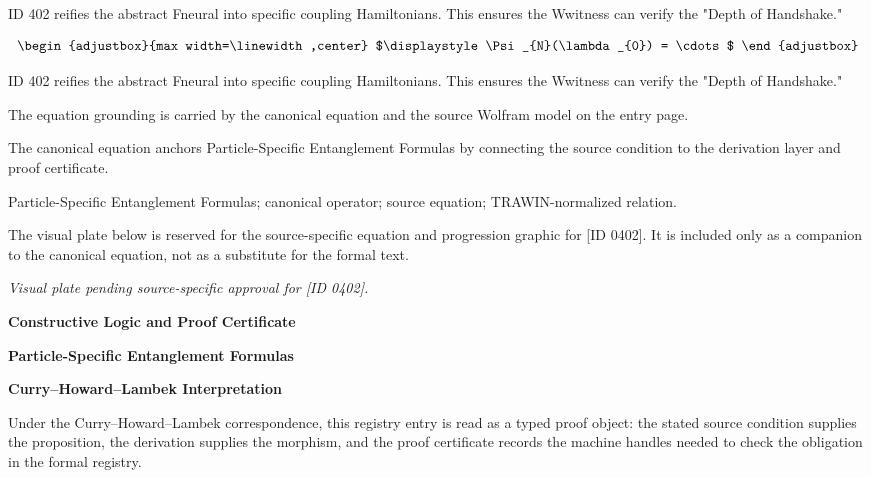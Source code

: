 ID 402 reifies the abstract Fneural into specific coupling Hamiltonians. This ensures the Wwitness can verify the "Depth of Handshake."

\[
\begin{adjustbox}{max width=\linewidth,center}
$\displaystyle
\Psi_{N}(\lambda_{0}) = \cdots
$
\end{adjustbox}
\]

ID 402 reifies the abstract Fneural into specific coupling Hamiltonians. This ensures the Wwitness can verify the "Depth of Handshake."

The equation grounding is carried by the canonical equation and the source Wolfram model on the entry page.

The canonical equation anchors Particle-Specific Entanglement Formulas by connecting the source condition to the derivation layer and proof certificate.

Particle-Specific Entanglement Formulas; canonical operator; source equation; TRAWIN-normalized relation.
\endgroup

\begingroup\footnotesize\sloppy
The visual plate below is reserved for the source-specific equation and progression graphic for [ID 0402]. It is included only as a companion to the canonical equation, not as a substitute for the formal text.
\par\endgroup
\begingroup\footnotesize\itshape
Visual plate pending source-specific approval for [ID 0402].
\par\endgroup

\clearpage
\begingroup\tzpsupportsetup
\noindent\textbf{\fontsize{10.8pt}{12.8pt}\selectfont [ID 0402] Constructive Logic and Proof Certificate}\par
\noindent\textbf{\fontsize{10pt}{12pt}\selectfont Particle-Specific Entanglement Formulas}\par
\vspace{0.45em}
\begingroup
\footnotesize
\setlength{\parskip}{0.22em}
\setlength{\parindent}{0pt}
\noindent\textbf{Curry--Howard--Lambek Interpretation}\par
Under the Curry--Howard--Lambek correspondence, this registry entry is read as a typed proof
object: the stated source condition supplies the proposition, the derivation supplies the
morphism, and the proof certificate records the machine handles needed to check the obligation
in the formal registry.

